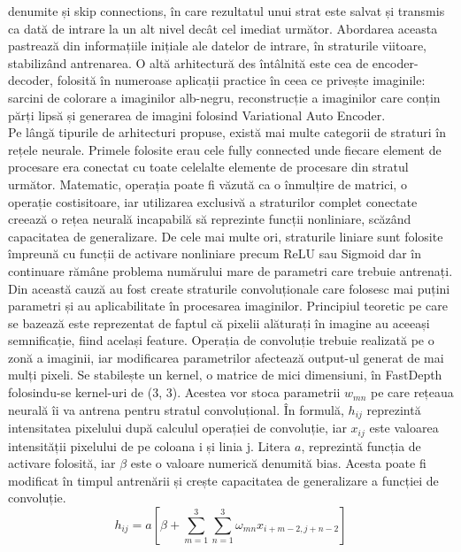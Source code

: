\documentclass[12pt,a4paper]{report}
\begin{document}
denumite și skip connections, în care rezultatul unui strat este salvat și transmis ca dată de
intrare la un alt nivel decât cel imediat următor. Abordarea aceasta pastrează din informațiile inițiale ale 
datelor de intrare, în straturile viitoare, stabilizând antrenarea. O altă arhitectură des 
întâlnită este cea de encoder-decoder, folosită în numeroase aplicații practice în ceea ce 
privește imaginile: sarcini de colorare a imaginilor alb-negru\cite{imageColorization}, reconstrucție a imaginilor care 
conțin părți lipsă și generarea de imagini folosind Variational Auto Encoder\cite{Islam2023FastAE}. \\
Pe lângă tipurile de arhitecturi propuse, există mai multe categorii de straturi în rețele neurale.
Primele folosite erau cele fully connected unde fiecare element de procesare era conectat 
cu toate celelalte elemente de procesare din stratul următor. Matematic, operația poate fi văzută 
ca o înmulțire de matrici, o operație costisitoare, iar utilizarea exclusivă a straturilor complet 
conectate creează o rețea neurală incapabilă să reprezinte funcții nonliniare, scăzând capacitatea de
generalizare. De cele mai multe ori, straturile liniare sunt folosite împreună cu funcții de
activare nonliniare precum ReLU sau Sigmoid dar în continuare rămâne problema numărului mare 
de parametri care trebuie antrenați. Din această cauză au fost create straturile convoluționale
care folosesc mai puțini parametri și au aplicabilitate în procesarea imaginilor. Principiul
teoretic pe care se bazează este reprezentat de faptul că pixelii alăturați în imagine au aceeași semnificație,
fiind același feature. Operația de convoluție trebuie realizată pe o zonă a imaginii, iar
modificarea parametrilor afectează output-ul generat de mai mulți pixeli. Se stabilește un kernel,
o matrice de  mici dimensiuni, în FastDepth folosindu-se kernel-uri de (3, 3). Acestea vor stoca
parametrii \(w_{mn}\) pe care rețeaua neurală îi va antrena pentru stratul 
convoluțional. În formulă, \(h_{ij}\) reprezintă intensitatea pixelului după calculul
operației de convoluție, iar \(x_{ij}\) este valoarea intensității pixelului de pe coloana i și linia j.  
Litera \(a\), reprezintă funcția de activare folosită, iar \(\beta\) este o valoare numerică
denumită bias. Acesta poate fi modificat în timpul antrenării și crește
capacitatea de generalizare a funcției de convoluție\cite{prince2023understanding}.  
\begin{equation}
h_{ij} = a \left[ \beta + \sum_{m=1}^{3} \sum_{n=1}^{3} \omega_{mn} x_{i+m-2, j+n-2} \right]
\end{equation}
\end{document}
